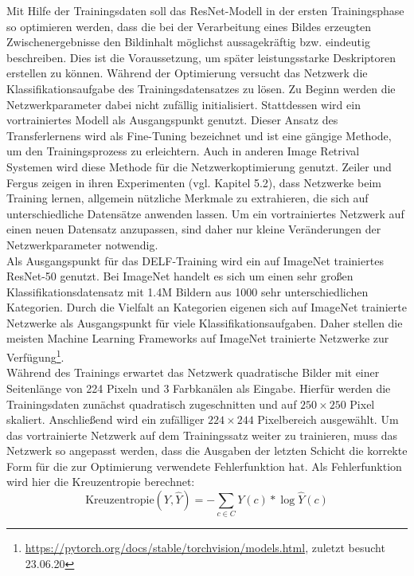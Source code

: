 Mit Hilfe der Trainingsdaten soll das ResNet-Modell in der ersten Trainingsphase so optimieren werden, dass die bei der Verarbeitung eines Bildes erzeugten Zwischenergebnisse den Bildinhalt möglichst aussagekräftig bzw. eindeutig beschreiben. Dies ist die Voraussetzung, um später leistungsstarke Deskriptoren erstellen zu können. Während der Optimierung versucht das Netzwerk die Klassifikationsaufgabe des Trainingsdatensatzes zu lösen. Zu Beginn werden die Netzwerkparameter dabei nicht zufällig initialisiert. Stattdessen wird ein vortrainiertes Modell als Ausgangspunkt genutzt. Dieser Ansatz des Transferlernens wird als Fine-Tuning bezeichnet und ist eine gängige Methode, um den Trainingsprozess zu erleichtern. Auch in anderen Image Retrival Systemen \cite{convnet} \cite{siamac_contrastive_loss} wird diese Methode für die Netzwerkoptimierung genutzt. Zeiler und Fergus zeigen in ihren Experimenten (vgl. \cite{extraction_point_meaning} Kapitel 5.2), dass Netzwerke beim Training lernen, allgemein nützliche Merkmale zu extrahieren, die sich auf unterschiedliche Datensätze anwenden lassen. Um ein vortrainiertes Netzwerk auf einen neuen Datensatz anzupassen, sind daher nur kleine Veränderungen der Netzwerkparameter notwendig.
\\
Als Ausgangspunkt für das DELF-Training wird ein auf ImageNet trainiertes ResNet-50 genutzt. Bei ImageNet handelt es sich um einen sehr großen Klassifikationsdatensatz mit 1.4M Bildern aus 1000 sehr unterschiedlichen Kategorien. Durch die Vielfalt an Kategorien eigenen sich auf ImageNet trainierte Netzwerke als Ausgangspunkt für viele Klassifikationsaufgaben. Daher stellen die meisten Machine Learning Frameworks auf ImageNet trainierte Netzwerke zur Verfügung\footnote{\url{https://pytorch.org/docs/stable/torchvision/models.html}, zuletzt besucht 23.06.20}. 
\\
Während des Trainings erwartet das Netzwerk quadratische Bilder mit einer Seitenlänge von 224 Pixeln und 3 Farbkanälen als Eingabe. Hierfür werden die Trainingsdaten zunächst quadratisch zugeschnitten und auf $250\times250$ Pixel skaliert. Anschließend wird ein zufälliger $224\times244$ Pixelbereich ausgewählt.
Um das vortrainierte Netzwerk auf dem Trainingssatz weiter zu trainieren, muss das Netzwerk so angepasst werden, dass die Ausgaben der letzten Schicht die korrekte Form für die zur Optimierung verwendete Fehlerfunktion hat. Als Fehlerfunktion wird hier die Kreuzentropie berechnet:
\begin{equation}
\text{Kreuzentropie}(Y,\hat{Y}) = -\sum_{c \in C}{Y(c)*\log\hat{Y}(c)}
\end{equation}

